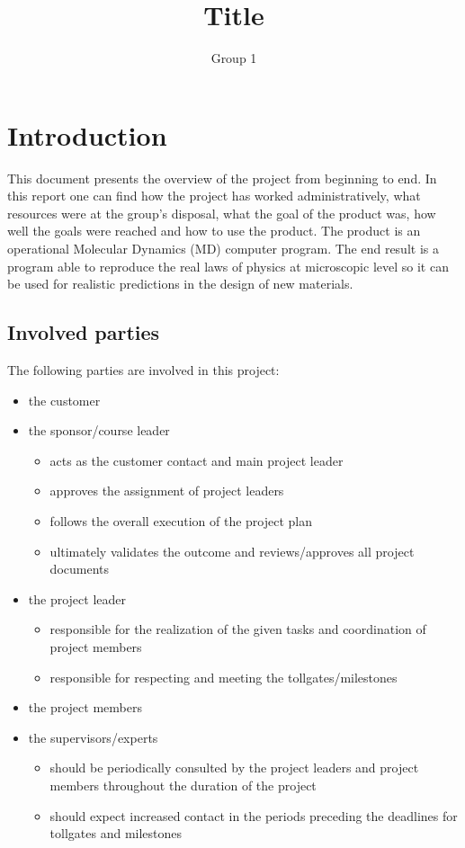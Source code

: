 \documentclass[12pt,a4paper]{article}
\begin{document}
\title{Title}
\author{Group 1}
 
\granskad{}{\today}
\godkand{}{\today}
\maketitle
\makestatus
\makeprojektidentitet
\makegruppmedlemmar
\makeprojektinfo
\makedokumenthistoria
\makeinnehall

\section{Introduction}
\label{sec:Introduction}
This document presents the overview of the project from beginning to end. In this report one can find how the project has worked administratively, what resources were at the group's disposal, what the goal of the product was, how well the goals were reached and how to use the product. The product is an operational Molecular Dynamics (MD) computer program. The end result is a program able to reproduce the real laws of physics at microscopic level so it can be used for realistic predictions in the design of new materials.

\subsection{Involved parties}
The following parties are involved in this project:
\begin{itemize}
\item the customer
\item the sponsor/course leader
	\begin{itemize}
	\item acts as the customer contact and main project leader
	\item approves the assignment of project leaders
	\item follows the overall execution of the project plan
	\item ultimately validates the outcome and reviews/approves all project documents
	\end{itemize}
\item the project leader
	\begin{itemize}
	\item responsible for the realization of the given tasks and coordination of project members
	\item responsible for respecting and meeting the tollgates/milestones
	\end{itemize}
\item the project members
\item the supervisors/experts
	\begin{itemize}
	\item should be periodically consulted by the project leaders and project members throughout the duration of the project
	\item should expect increased contact in the periods preceding the deadlines for tollgates and milestones
	\end{itemize}
\end{itemize}
\end{document}
